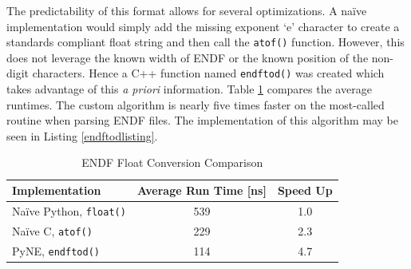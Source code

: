 \documentclass{anstrans}
\begin{document}
The predictability of this format allows for several optimizations.  A na\"{i}ve 
implementation would simply add the missing exponent `e' character to create
a standards compliant float string and then call the \texttt{atof()} function.  
However, this does not leverage the known width of ENDF or the known position of
the non-digit characters.  Hence a C++ function named \texttt{endftod()} was 
created which takes advantage of this \emph{a priori} information.  
Table \ref{endftod} compares the average runtimes. The custom algorithm is nearly 
five times faster on the most-called routine when parsing ENDF files.  
The implementation of this algorithm may be seen in Listing \ref{endftodlisting}.

\begin{table}
\centering
\caption{ENDF Float Conversion Comparison}
\label{endftod}
{\small
\begin{tabular}[htbp]{lcc}
\toprule
\textbf{Implementation} & \textbf{Average Run Time [ns]} & \textbf{Speed Up} \\
\midrule
Na\"{i}ve Python, \texttt{float()} & 539 & 1.0 \\
Na\"{i}ve C, \texttt{atof()} & 229 & 2.3 \\
PyNE, \texttt{endftod()} & 114 & 4.7 \\
\bottomrule
\end{tabular}
}
\end{table}
\end{document}

